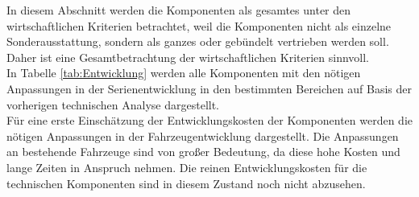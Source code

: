 In diesem Abschnitt werden die Komponenten als gesamtes unter den wirtschaftlichen Kriterien betrachtet, weil die Komponenten nicht als einzelne Sonderausstattung, sondern als ganzes oder gebündelt vertrieben werden soll. Daher ist eine Gesamtbetrachtung der wirtschaftlichen Kriterien sinnvoll. \\
In Tabelle \ref{tab:Entwicklung} werden alle Komponenten mit den nötigen Anpassungen in der Serienentwicklung in den bestimmten Bereichen auf Basis der vorherigen technischen Analyse dargestellt. \\
Für eine erste Einschätzung der Entwicklungskosten der Komponenten werden die nötigen Anpassungen in der Fahrzeugentwicklung dargestellt. Die Anpassungen an bestehende Fahrzeuge sind von großer Bedeutung, da diese hohe Kosten und lange Zeiten in Anspruch nehmen. Die reinen Entwicklungskosten für die technischen Komponenten sind in diesem Zustand noch nicht abzusehen.
